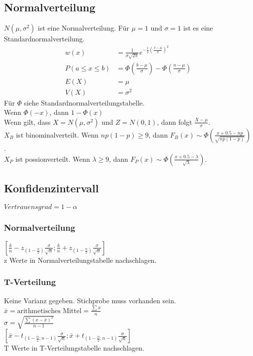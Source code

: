 \documentclass[a4paper, 8pt, landscape]{extarticle}
\let\oldsum\sum
\renewcommand{\sum}{\ensuremath{\textstyle\oldsum}}
\begin{document}
\begin{multicols*}{5}
	    	\subsection{Normalverteilung}
		    	$N(\mu, \sigma^2)$ ist eine Normalverteilung. Für $\mu = 1$ und $\sigma = 1$ ist es eine Standardnormalverteilung.
		    	\begin{align*}
		    		w(x) &= \frac{1}{\sigma \sqrt{2 \pi}} e^{-\frac{1}{2}(\frac{x-\mu}{\sigma})^2}\\
		    		P(a\le x\le b)&= \Phi(\frac{b-\mu}{\sigma})-\Phi(\frac{a-\mu}{\sigma})\\
		    		E(X)&=\mu\\
		    		V(X)&=\sigma^2
		    	\end{align*}
		    	Für $\Phi$ siehe Standardnormalverteilungstabelle.\\
		    	Wenn $\Phi(-x)$, dann $1-\Phi(x)$\\
	    	
		    	Wenn gilt, dass $X = N(\mu, \sigma^2)$ und $Z = N(0,1)$, dann folgt $\frac{X - \mu}{\sigma}$. \\
		    	$X_B$ ist binominalverteilt. Wenn $np(1-p)\ge9$, dann $F_B(x) \sim \Phi\left(\frac{x + 0.5 - np}{\sqrt{np(1-p)}}\right)$. \\
		    	$X_P$ ist possionverteilt. Wenn $\lambda \ge 9$, dann $F_P(x) \sim \Phi\left(\frac{x + 0.5 - \lambda}{\sqrt{\lambda}}\right)$.
	    	\subsection{Konfidenzintervall}
		    	$Vertrauensgrad=1-\alpha$
		    	\subsubsection{Normalverteilung}
				    $[\frac{k}{n}-z_{(1-\frac{\alpha}{2})}\frac{\sigma}{\sqrt{n}};\frac{k}{n}+z_{(1-\frac{\alpha}{2})}\frac{\sigma}{\sqrt{n}}]$\\
				    z Werte in Normalverteilungstabelle nachschlagen. 
		    	\subsubsection{T-Verteilung}
			    	Keine Varianz gegeben. Stichprobe muss vorhanden sein.\\
				    $\bar{x}=\text{arithmetisches Mittel}=\frac{\sum x}{n}$\\
				    $\sigma=\sqrt{\frac{\sum(x-\bar{x})^{2}}{n-1}}$\\
				    $[\bar{x}-t_{(1-\frac{\alpha}{2};n-1)}\frac{\sigma}{\sqrt{n}};\bar{x}+t_{(1-\frac{\alpha}{2};n-1)}\frac{\sigma}{\sqrt{n}}]$\\
				    T Werte in T-Verteilungstabelle nachschlagen.

\end{multicols*}
\end{document}
